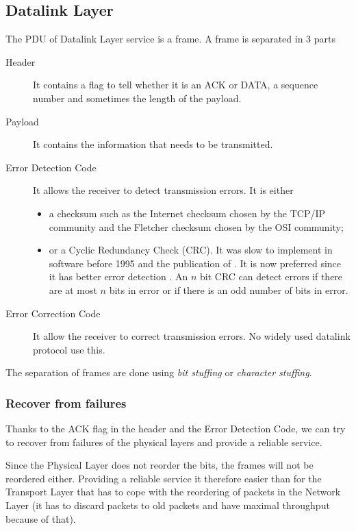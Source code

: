 \subsection{Datalink Layer}
The PDU of Datalink Layer service is a frame.
A frame is separated in 3 parts
\begin{description}
  \item[Header] It contains a flag to tell whether it is an ACK or DATA, a sequence number and sometimes the length of the payload.
  \item[Payload] It contains the information that needs to be transmitted.
  \item[Error Detection Code] It allows the receiver to detect transmission errors.
    It is either
    \begin{itemize}
      \item a checksum such as the Internet checksum chosen by the TCP/IP community and the
        Fletcher checksum chosen by the OSI community;
      \item or a Cyclic Redundancy Check (CRC).
        It was slow to implement in software before 1995 and the publication of \cite{feldmeier1995fast}.
        It is now preferred since it has better error detection \cite{stone1998performance}.
        An $n$ bit CRC can detect errors if there are at most $n$
        bits in error or if there is an odd number of bits in error.
    \end{itemize}
  \item[Error Correction Code] It allow the receiver to correct transmission errors.
    No widely used datalink protocol use this.
\end{description}

The separation of frames are done using \emph{bit stuffing}
or \emph{character stuffing}.

\subsubsection{Recover from failures}
Thanks to the ACK flag in the header and the Error Detection Code,
we can try to recover from failures of the physical layers
and provide a reliable service.

Since the Physical Layer does not reorder the bits,
the frames will not be reordered either.
Providing a reliable service it therefore easier than for the Transport Layer that has to cope with the reordering of packets in the Network Layer (it has to discard packets to old packets and have maximal throughput because of that).

